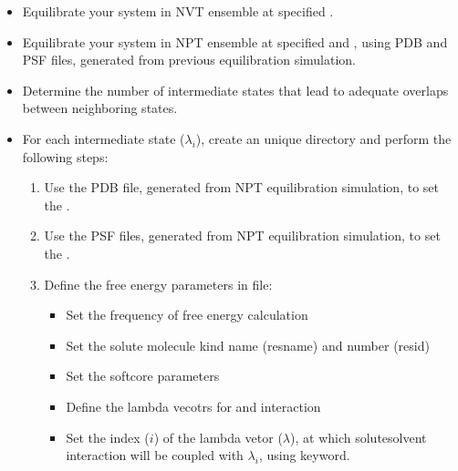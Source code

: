 \documentclass[letterpaper,10pt,english]{sphinxmanual}
\begin{document}
\begin{enumerate}
\begin{itemize}
\item {} 
Equilibrate your system in NVT ensemble at specified .

\item {} 
Equilibrate your system in NPT ensemble at specified  and , using
PDB and PSF  files, generated from previous equilibration simulation.

\item {} 
Determine the number of intermediate states that lead to adequate overlaps between
neighboring states.

\item {} 
For each intermediate state (\(\lambda_i\)), create an unique directory and perform the following steps:
\begin{enumerate}
%
\item {} 
Use the  PDB file, generated from NPT equilibration simulation, to set the .

\item {} 
Use the  PSF files, generated from NPT equilibration simulation, to set the .

\item {} 
Define the free energy parameters in  file:
\begin{itemize}
\item {} 
Set the frequency of free energy calculation

\item {} 
Set the solute molecule kind name (resname) and number (resid)

\item {} 
Set the soft\sphinxhyphen{}core parameters

\item {} 
Define the lambda vecotrs for  and  interaction

\item {} 
Set the index (\(i\)) of the lambda vetor (\(\lambda\)), at which solute\sphinxhyphen{}solvent interaction
will be coupled with \(\lambda_i\), using  keyword.

\end{itemize}


\end{enumerate}
\end{itemize}
\end{enumerate}
\end{document}
